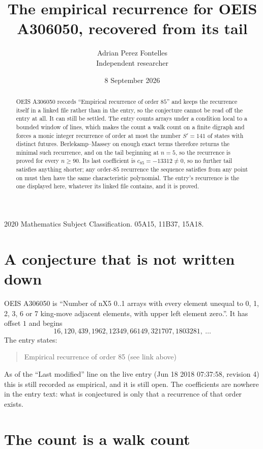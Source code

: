 \documentclass[11pt,a4paper]{article}
\title{The empirical recurrence for OEIS A306050, recovered from its tail}
\author{Adrian Perez Fontelles\\ \small Independent researcher}
\date{8 September 2026}
\theoremstyle{plain}
\theoremstyle{definition}
\begin{document}
\maketitle

\begin{abstract}
OEIS A306050 records ``Empirical recurrence of order $85$'' and keeps the recurrence itself in
a linked file rather than in the entry, so the conjecture cannot be read off the entry at all.
It can still be settled. The entry counts arrays under a condition local to a bounded window of
lines, which makes the count a walk count on a finite digraph and forces a monic integer
recurrence of order at most the number $S'=141$ of states with distinct futures. Berlekamp--Massey on
enough exact terms therefore returns the minimal such recurrence, and on the tail beginning at $n=5$, so the recurrence is proved for every $n\ge90$.
Its last coefficient is $c_{85}=-13312\neq0$, so no further tail satisfies anything
shorter; any order-$85$ recurrence the sequence satisfies from any point on must then have
the same characteristic polynomial. The entry's recurrence is the one displayed here, whatever
its linked file contains, and it is proved.
\end{abstract}

\noindent\small 2020 Mathematics Subject Classification. 05A15, 11B37, 15A18.\normalsize

\section{A conjecture that is not written down}

OEIS A306050 is ``Number of nX5 0..1 arrays with every element unequal to 0, 1, 2, 3, 6 or 7 king-move adjacent elements, with upper left element zero.''. It has offset $1$ and begins
\[
16, 120, 439, 1962, 12349, 66149, 321707, 1803281,\ \dots
\]
The entry states:
\begin{quote}
Empirical recurrence of order 85 (see link above)
\end{quote}
As of the ``Last modified'' line on the live entry (Jun 18 2018 07:37:58, revision 4)
this is still recorded as empirical, and it is still open. The coefficients are nowhere in the
entry text: what is conjectured is only that a recurrence of that order exists.

\section{The count is a walk count}
\end{document}
